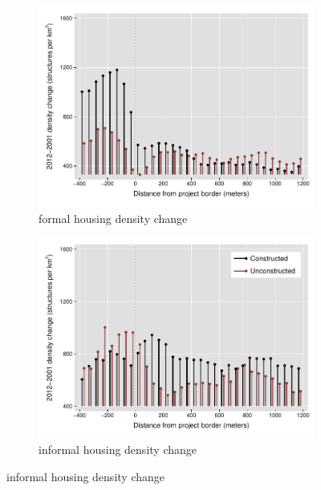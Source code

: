 \documentclass[12pt]{article}
\begin{document}
\begin{figure}[t!]
        \centering
        \caption[ Changes in Housing Densities in Constructed and Unconstructed Projects Areas]
        {\small Housing Densities in Constructed and Unconstructed projects } 
        \begin{subfigure}[b]{0.495\textwidth}   
            \centering 
            \includegraphics[width=\textwidth,trim={0.3cm .3cm 0.1cm 0cm}, clip=true]{figures/bblu_for_rawchanges}
            \caption[]%
            {{\small formal housing density change}}    
            \label{fig:forchange}
        \end{subfigure}
        \hfill
        \begin{subfigure}[b]{0.495\textwidth}   
            \centering 
            \includegraphics[width=\textwidth,trim={0.3cm .3cm 0.1cm 0cm}, clip=true]{figures/bblu_inf_rawchanges}
            \caption[]%
            {{\small informal housing density change}}    
            \label{fig:infchange}
        \end{subfigure}
        \label{fig:rawbblumeans}
        \vspace{-6mm}
    \end{figure} 
\end{document}
